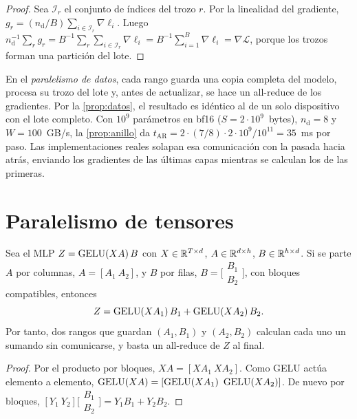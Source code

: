 \begin{proof}
Sea $\mathcal{I}_r$ el conjunto de índices del trozo $r$. Por la linealidad del gradiente, $g_r=(n_{\mathrm{d}}/B)\sum_{i\in\mathcal{I}_r}\nabla\ell_i$. Luego $n_{\mathrm{d}}^{-1}\sum_r g_r=B^{-1}\sum_r\sum_{i\in\mathcal{I}_r}\nabla\ell_i=B^{-1}\sum_{i=1}^{B}\nabla\ell_i=\nabla\mathcal{L}$, porque los trozos forman una partición del lote.
\end{proof}

En el \emph{paralelismo de datos}, cada rango guarda una copia completa del modelo, procesa su trozo del lote y, antes de actualizar, se hace un all-reduce de los gradientes. Por la \cref{prop:datos}, el resultado es idéntico al de un solo dispositivo con el lote completo. Con $10^{9}$ parámetros en bf16 ($S=2\cdot 10^{9}$~bytes), $n_{\mathrm{d}}=8$ y $W=100$~GB/s, la \cref{prop:anillo} da $t_{\mathrm{AR}}=2\cdot(7/8)\cdot 2\cdot 10^{9}/10^{11}=35$~ms por paso. Las implementaciones reales solapan esa comunicación con la pasada hacia atrás, enviando los gradientes de las últimas capas mientras se calculan los de las primeras.

\section{Paralelismo de tensores}

\begin{proposicion}\label{prop:megatron}
Sea el MLP $Z=\operatorname{GELU}(XA)\,B$ con $X\in\mathbb{R}^{T\times d}$, $A\in\mathbb{R}^{d\times h}$, $B\in\mathbb{R}^{h\times d}$. Si se parte $A$ por columnas, $A=[A_1\ A_2]$, y $B$ por filas, $B=\bigl[\begin{smallmatrix}B_1\\ B_2\end{smallmatrix}\bigr]$, con bloques compatibles, entonces
\[
Z=\operatorname{GELU}(XA_1)\,B_1+\operatorname{GELU}(XA_2)\,B_2.
\]
Por tanto, dos rangos que guardan $(A_1,B_1)$ y $(A_2,B_2)$ calculan cada uno un sumando sin comunicarse, y basta un all-reduce de $Z$ al final.
\end{proposicion}

\begin{proof}
Por el producto por bloques, $XA=[XA_1\ XA_2]$. Como GELU actúa elemento a elemento, $\operatorname{GELU}(XA)=[\operatorname{GELU}(XA_1)\ \operatorname{GELU}(XA_2)]$. De nuevo por bloques, $[Y_1\ Y_2]\bigl[\begin{smallmatrix}B_1\\ B_2\end{smallmatrix}\bigr]=Y_1B_1+Y_2B_2$.
\end{proof}

